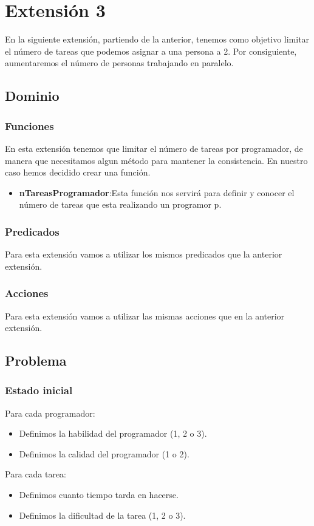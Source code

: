 \documentclass[11pt]{article}
\begin{document}
\section{Extensión 3}
En la siguiente extensión, partiendo de la anterior, tenemos como objetivo limitar el número de tareas que podemos asignar a una persona a 2. Por consiguiente, aumentaremos el número de personas trabajando en paralelo. 
\subsection{Dominio}
\subsubsection{Funciones}
En esta extensión tenemos que limitar el número de tareas por programador, de manera que necesitamos algun método para mantener la consistencia. En nuestro caso hemos decidido crear una función.
\begin{itemize}
	\item \textbf{nTareasProgramador}:Esta función nos servirá para definir y conocer el número de tareas que esta realizando un programor p.  
\end{itemize}
\subsubsection{Predicados}
Para esta extensión vamos a utilizar los mismos predicados que la anterior extensión.
\subsubsection{Acciones}
Para esta extensión vamos a utilizar las mismas acciones que en la anterior extensión.
\subsection{Problema}
\subsubsection{Estado inicial}
Para cada programador:
\begin{itemize}
  	\item Definimos la habilidad del programador (1, 2 o 3).
  	\item Definimos la calidad del programador (1 o 2).
\end{itemize}

\noindent Para cada tarea:
\begin{itemize}
  	\item Definimos cuanto tiempo tarda en hacerse.
  	\item Definimos la dificultad de la tarea (1, 2 o 3).
\end{itemize}
\end{document}
